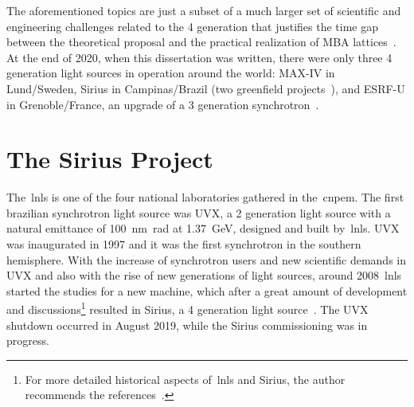 The aforementioned topics are just a subset of a much larger set of scientific and engineering challenges related to the 4 generation that justifies the time gap between the theoretical proposal and the practical realization of MBA lattices~\cite{hettel, neuenschwander}. At the end of 2020, when this dissertation was written, there were only three 4 generation light sources in operation around the world: MAX-IV in Lund/Sweden, Sirius in Campinas/Brazil (two greenfield projects~\cite{tavaresmaxiv, liu2014}), and ESRF-U in Grenoble/France, an upgrade of a 3 generation synchrotron~\cite{raimondi}.
\section{The Sirius Project}\label{sec:sirius_project}
The~\gls{lnls} is one of the four national laboratories gathered in the~\gls{cnpem}. The first brazilian synchrotron light source was UVX, a 2 generation light source with a natural emittance of \SI{100}{\nano\meter\radian} at \SI{1.37}{\giga\electronvolt}, designed and built by~\gls{lnls}. UVX was inaugurated in 1997 and it was the first synchrotron in the southern hemisphere. With the increase of synchrotron users and new scientific demands in UVX and also with the rise of new generations of light sources, around 2008~\gls{lnls} started the studies for a new machine, which after a great amount of development and discussions\footnote{For more detailed historical aspects of~\gls{lnls} and Sirius, the author recommends the references~\cite{liu2019, aldo2019}.} resulted in Sirius, a 4 generation light source~\cite{liu2014}. The UVX shutdown occurred in August 2019, while the Sirius commissioning was in progress.

